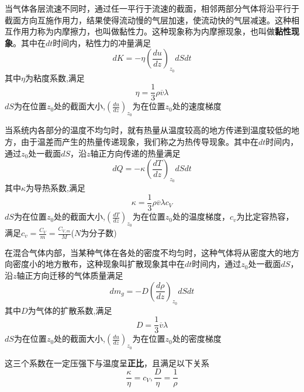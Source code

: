 \documentclass[lang=cn,10pt]{elegantbook}
\begin{document}
    
    \begin{definition}[黏性现象]
    	当气体各层流速不同时，通过任一平行于流速的截面，相邻两部分气体将沿平行于截面方向互施作用力，结果使得流动慢的气层加速，使流动快的气层减速。这种相互作用力称为内摩擦力，也叫做黏性力。这种现象称为内摩擦现象，也叫做\textbf{黏性现象}。其中在$dt$时间内，粘性力的冲量满足
    	\begin{equation*}
    		dK=-\eta \left( \frac{du}{dz} \right) _{z_0}dSdt
    	\end{equation*}
    	其中$\eta $为粘度系数,满足
    	\begin{equation*}
    		\eta =\frac{1}{3}\rho \overline{v}\lambda 
    	\end{equation*}$dS$为在位置$z_{0}$处的截面大小,$\left( \frac{du}{dz} \right) _{z_0}$为在位置$z_{0}$处的速度梯度
    \end{definition}
    
    \begin{definition}[热传导现象]
    	当系统内各部分的温度不均匀时，就有热量从温度较高的地方传递到温度较低的地方，由于温差而产生的热量传递现象，我们称之为热传导现象。其中在$dt$时间内，通过$z_{0}$处一截面$dS$，沿$z$轴正方向传递的热量满足
    	\begin{equation*}
    		dQ=-\kappa \left( \frac{dT}{dz} \right) _{z_0}dSdt
    	\end{equation*}
    	其中$\kappa $为导热系数,满足
    	\begin{equation*}
    		\kappa =\frac{1}{3}\rho \overline{v}\lambda c_{V}
    	\end{equation*}$dS$为在位置$z_{0}$处的截面大小,$\left( \frac{dT}{dz} \right) _{z_0}$为在位置$z_{0}$处的温度梯度，$c_{v}$为比定容热容，满足$c_{v}=\frac{C_{V}}{m}=\frac{C_{V,m}}{M}$($N$为分子数)
    \end{definition}
    
    \begin{definition}[扩散现象]
    	在混合气体内部，当某种气体在各处的密度不均匀时，这种气体将从密度大的地方向密度小的地方散布，这种现象叫扩散现象其中在$dt$时间内，通过$z_{0}$处一截面$dS$，沿$z$轴正方向迁移的气体质量满足
    	\begin{equation*}
    		dm_{g}=-D \left( \frac{d\rho}{dz} \right) _{z_0}dSdt
    	\end{equation*}
    	其中$D $为气体的扩散系数,满足
    	\begin{equation*}
    		D =\frac{1}{3}\overline{v}\lambda 
    	\end{equation*}$dS$为在位置$z_{0}$处的截面大小,$\left( \frac{du}{dz} \right) _{z_0}$为在位置$z_{0}$处的密度梯度
    \end{definition}
    \begin{note}
    	这三个系数在一定压强下与温度呈\textbf{正比}，且满足以下关系
    	\begin{equation*}
    		\frac{\kappa}{\eta}=c_{V},\frac{D}{\eta}=\frac{1}{\rho}
    	\end{equation*}
    \end{note}
\end{document}
